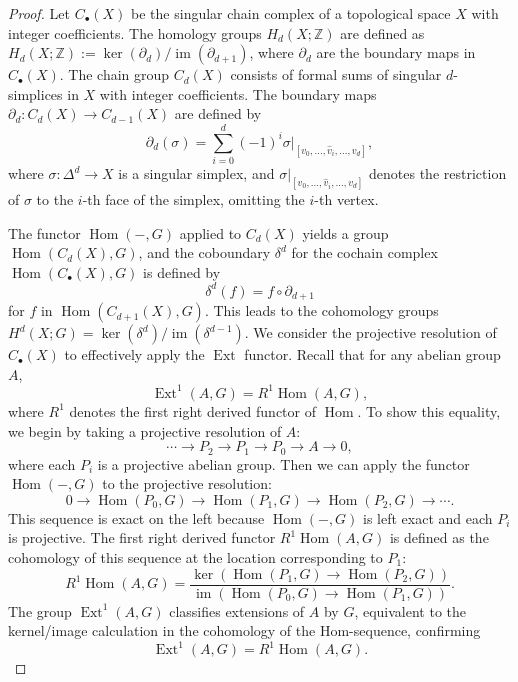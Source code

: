 \begin{proof}
Let \( C_\bullet(X) \) be the singular chain complex of a topological space \( X \) with integer coefficients. The homology groups \( H_d(X; \mathbb{Z}) \) are defined as \( H_d(X; \mathbb{Z}) := \ker(\partial_d) / \operatorname{im}(\partial_{d+1}) \), where \( \partial_d \) are the boundary maps in \( C_\bullet(X) \). The chain group \( C_d(X) \) consists of formal sums of singular \( d \)-simplices in \( X \) with integer coefficients. The boundary maps \( \partial_d: C_d(X) \rightarrow C_{d-1}(X) \) are defined by
\[
\partial_d(\sigma) = \sum_{i=0}^{d} (-1)^i \sigma|_{[v_0, \ldots, \hat{v}_i, \ldots, v_d]},
\]
where \( \sigma: \Delta^d \rightarrow X \) is a singular simplex, and \( \sigma|_{[v_0, \ldots, \hat{v}_i, \ldots, v_d]} \) denotes the restriction of \( \sigma \) to the \( i \)-th face of the simplex, omitting the \( i \)-th vertex.

The functor \( \operatorname{Hom}(-, G) \) applied to \( C_d(X) \) yields a group \( \operatorname{Hom}(C_d(X), G) \), and the coboundary \( \delta^d \) for the cochain complex \( \operatorname{Hom}(C_\bullet(X), G) \) is defined by
\[
\delta^d(f) = f \circ \partial_{d+1}
\]
for \( f \) in \( \operatorname{Hom}(C_{d+1}(X), G) \). This leads to the cohomology groups \( H^d(X; G) = \ker(\delta^d) / \operatorname{im}(\delta^{d-1}) \). We consider the projective resolution of \( C_\bullet(X) \) to effectively apply the \( \operatorname{Ext} \) functor. Recall that for any abelian group \( A \),
\[
\operatorname{Ext}^1(A, G) = R^1 \operatorname{Hom}(A, G),
\]
where \( R^1 \) denotes the first right derived functor of \( \operatorname{Hom} \). To show this equality, we begin by taking a projective resolution of \( A \):
\[
\cdots \to P_2 \to P_1 \to P_0 \to A \to 0,
\]
where each \( P_i \) is a projective abelian group. Then we can apply the functor \( \operatorname{Hom}(-, G) \) to the projective resolution:
\[
0 \to \operatorname{Hom}(P_0, G) \to \operatorname{Hom}(P_1, G) \to \operatorname{Hom}(P_2, G) \to \cdots.
\]
This sequence is exact on the left because \( \operatorname{Hom}(-, G) \) is left exact and each \( P_i \) is projective. The first right derived functor \( R^1\operatorname{Hom}(A, G) \) is defined as the cohomology of this sequence at the location corresponding to \( P_1 \):
\[
R^1 \operatorname{Hom}(A, G) = \frac{\ker(\operatorname{Hom}(P_1, G) \to \operatorname{Hom}(P_2, G))}{\operatorname{im}(\operatorname{Hom}(P_0, G) \to \operatorname{Hom}(P_1, G))}.
\]
The group \( \operatorname{Ext}^1(A, G) \) classifies extensions of \( A \) by \( G \), equivalent to the kernel/image calculation in the cohomology of the $\text{Hom}$-sequence, confirming
\[
\operatorname{Ext}^1(A, G) = R^1 \operatorname{Hom}(A, G).
\]



\end{proof}
